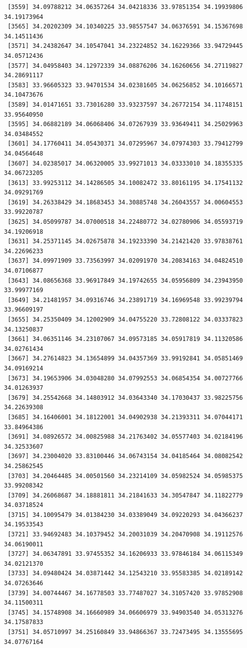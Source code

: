 \documentclass[
  letterpaper,
  DIV=11,
  numbers=noendperiod]{scrartcl}
\begin{document}
\begin{verbatim}
 [3559] 34.09788212 34.06357264 34.04218336 33.97851354 34.19939806 34.19173964
 [3565] 34.20202309 34.10340225 33.98557547 34.06376591 34.15367698 34.14511436
 [3571] 34.24382647 34.10547041 34.23224852 34.16229366 33.94729445 34.05712436
 [3577] 34.04958403 34.12972339 34.08876206 34.16260656 34.27119827 34.28691117
 [3583] 33.96605323 33.94701534 34.02381605 34.06256852 34.10166571 34.10473676
 [3589] 34.01471651 33.73016280 33.93237597 34.26772154 34.11748151 33.95640950
 [3595] 34.06882189 34.06068406 34.07267939 33.93649411 34.25029963 34.03484552
 [3601] 34.17760411 34.05430371 34.07295967 34.07974303 33.79412799 34.04564648
 [3607] 34.02385017 34.06320005 33.99271013 34.03333010 34.18355335 34.06723205
 [3613] 33.99253112 34.14286505 34.10082472 33.80161195 34.17541132 34.09291769
 [3619] 34.26338429 34.18683453 34.30885748 34.26043557 34.00604553 33.99220787
 [3625] 34.05099787 34.07000518 34.22480772 34.02780906 34.05593719 34.19206918
 [3631] 34.25371145 34.02675878 34.19233390 34.21421420 33.97838761 34.22696233
 [3637] 34.09971909 33.73563997 34.02091970 34.20834163 34.04824510 34.07106877
 [3643] 34.08656368 33.96917849 34.19742655 34.05956809 34.23943950 33.99977169
 [3649] 34.21481957 34.09316746 34.23891719 34.16969548 33.99239794 33.96609197
 [3655] 34.25350409 34.12002909 34.04755220 33.72808122 34.03337823 34.13250837
 [3661] 34.06351146 34.23107067 34.09573185 34.05917819 34.11320586 34.02761434
 [3667] 34.27614823 34.13654899 34.04357369 33.99192841 34.05851469 34.09169214
 [3673] 34.19653906 34.03048280 34.07992553 34.06854354 34.00727766 34.01263937
 [3679] 34.25542668 34.14803912 34.03643340 34.17030437 33.98225756 34.22639308
 [3685] 34.16406001 34.18122001 34.04902938 34.21393311 34.07044171 33.84964386
 [3691] 34.08926572 34.00825988 34.21763402 34.05577403 34.02184196 34.32533607
 [3697] 34.23004020 33.83100446 34.06743154 34.04185464 34.08082542 34.25862545
 [3703] 34.20464485 34.00501560 34.23214109 34.05982524 34.05985375 33.99208342
 [3709] 34.26068687 34.18881811 34.21841633 34.30547847 34.11822779 34.03718524
 [3715] 34.10095479 34.01384230 34.03389049 34.09220293 34.04366237 34.19533543
 [3721] 33.94692483 34.10379452 34.20031039 34.20470908 34.19112576 34.06190011
 [3727] 34.06347891 33.97455352 34.16206933 33.97846184 34.06115349 34.02121370
 [3733] 34.09480424 34.03871442 34.12543210 33.95583385 34.02189142 34.07263646
 [3739] 34.00744467 34.16778503 33.77487027 34.31057420 33.97852908 34.11500311
 [3745] 34.15748908 34.16660989 34.06606979 33.94903540 34.05313276 34.17587833
 [3751] 34.05710997 34.25160849 33.94866367 33.72473495 34.13555695 34.07767164

\end{verbatim}
\end{document}
